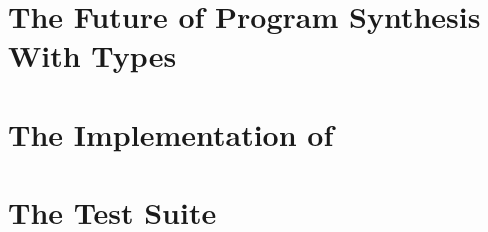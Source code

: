 \chapter{The Future of Program Synthesis With Types}
\label{ch:the-future-of-program-synthesis-with-types}


\appendix

\chapter{The Implementation of \texorpdfstring{\myth{}}{Myth}}
\label{app:the-implementation-of-myth}


\chapter{The \texorpdfstring{\myth{}}{Myth} Test Suite}
\label{app:the-myth-test-suite}

